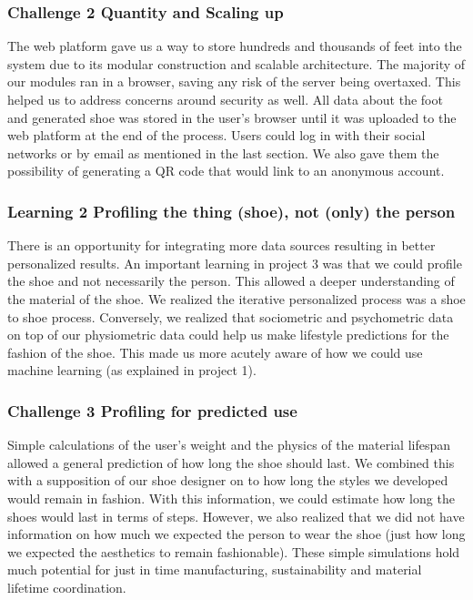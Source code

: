 \subsubsection{Challenge 2 Quantity and Scaling up}

The web platform gave us a way to store hundreds and thousands of feet into the system due to its modular construction and scalable architecture. The majority of our modules ran in a browser, saving any risk of the server being overtaxed. This helped us to address concerns around security as well. All data about the foot and generated shoe was stored in the user's browser until it was uploaded to the web platform at the end of the process. Users could log in with their social networks or by email as mentioned in the last section. We also gave them the possibility of generating a QR code that would link to an anonymous account.

\subsubsection{Learning 2 Profiling the thing (shoe), not (only) the person}

There is an opportunity for integrating more data sources resulting in better personalized results. An important learning in project 3 was that we could profile the shoe and not necessarily the person. This allowed a deeper understanding of the material of the shoe. We realized the iterative personalized process was a shoe to shoe process. Conversely, we realized that sociometric and psychometric data on top of our physiometric data could help us make lifestyle predictions for the fashion of the shoe. This made us more acutely aware of how we could use machine learning (as explained in project 1). 

\subsubsection{Challenge 3 Profiling for predicted use}

Simple calculations of the user's weight and the physics of the material lifespan allowed a general prediction of how long the shoe should last. We combined this with a supposition of our shoe designer on to how long the styles we developed would remain in fashion. With this information, we could estimate how long the shoes would last in terms of steps.  However, we also realized that we did not have information on how much we expected the person to wear the shoe (just how long we expected the aesthetics to remain fashionable). These simple simulations hold much potential for just in time manufacturing, sustainability and material lifetime coordination.  


